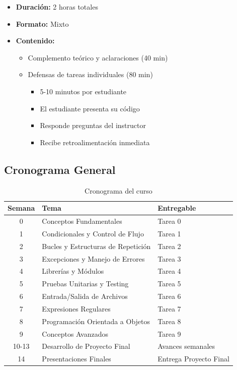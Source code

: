 \documentclass[12pt,letterpaper]{article}
\begin{document}
\begin{itemize}[leftmargin=*]
    \item \textbf{Duración:} 2 horas totales
    \item \textbf{Formato:} Mixto
    \item \textbf{Contenido:}
    \begin{itemize}
        \item Complemento teórico y aclaraciones (40 min)
        \item Defensas de tareas individuales (80 min)
        \begin{itemize}
            \item 5-10 minutos por estudiante
            \item El estudiante presenta su código
            \item Responde preguntas del instructor
            \item Recibe retroalimentación inmediata
        \end{itemize}
    \end{itemize}
\end{itemize}

\subsection{Cronograma General}

\begin{table}[h]
\centering
\begin{tabularx}{\textwidth}{|c|X|l|}
\hline
\textbf{Semana} & \textbf{Tema} & \textbf{Entregable} \\
\hline
0 & Conceptos Fundamentales & Tarea 0 \\
\hline
1 & Condicionales y Control de Flujo & Tarea 1 \\
\hline
2 & Bucles y Estructuras de Repetición & Tarea 2 \\
\hline
3 & Excepciones y Manejo de Errores & Tarea 3 \\
\hline
4 & Librerías y Módulos & Tarea 4 \\
\hline
5 & Pruebas Unitarias y Testing & Tarea 5 \\
\hline
6 & Entrada/Salida de Archivos & Tarea 6 \\
\hline
7 & Expresiones Regulares & Tarea 7 \\
\hline
8 & Programación Orientada a Objetos & Tarea 8 \\
\hline
9 & Conceptos Avanzados & Tarea 9 \\
\hline
10-13 & Desarrollo de Proyecto Final & Avances semanales \\
\hline
14 & Presentaciones Finales & Entrega Proyecto Final \\
\hline
\end{tabularx}
\caption{Cronograma del curso}
\end{table}
\end{document}
